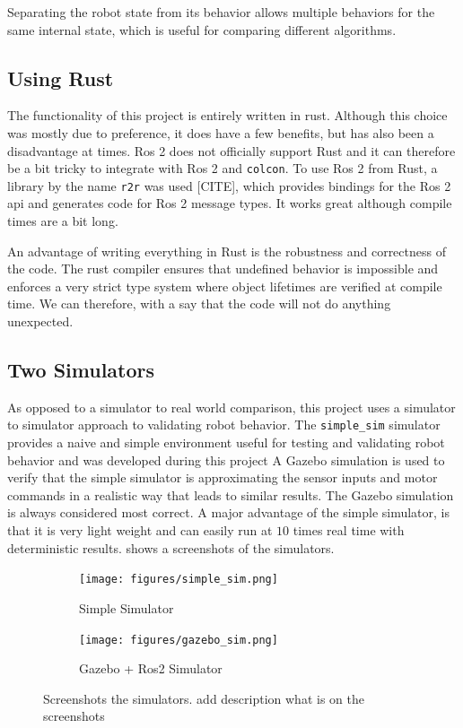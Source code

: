 Separating the robot state from its behavior allows multiple behaviors for the same internal state, which is useful for comparing different algorithms.

\subsection{Using Rust}
The {\color{red} functionality} of this project is entirely written in rust. Although this choice was mostly due to preference, it does have a few benefits, but has also been a {\color{red} disadvantage} at times. Ros 2 {\color{red} does not officially support Rust} and it can therefore be a bit tricky to integrate with Ros 2 and \texttt{colcon}. To use Ros 2 from Rust, a library by the name \texttt{r2r} was used {\color{red}[CITE]}, which provides bindings for the Ros 2 api and generates code for Ros 2 message types. It works great although compile times are a bit long.

An advantage of writing everything in Rust is the robustness and correctness of the code. The rust compiler ensures that undefined behavior is impossible and enforces a very strict type system where object lifetimes are verified at compile time. We can therefore, with a say that the code will not do anything unexpected.

\subsection{Two Simulators}
As opposed to a simulator to real world comparison, this project uses a simulator to simulator approach to validating robot behavior. The \texttt{simple\_sim} simulator provides a naive and simple environment useful for testing and validating robot behavior and was developed during this project A Gazebo simulation is used to verify that the simple simulator is approximating the sensor inputs and motor commands in a realistic way that leads to similar results. The Gazebo simulation is always considered most correct. A major advantage of the simple simulator, is that it is very light weight and can easily run at $10$ times real time with deterministic results.  shows a screenshots of the simulators.

\begin{figure}[h]
    \centering
    \begin{subfigure}[b]{0.45\textwidth}
        \centering
        \texttt{[image: figures/simple\_sim.png]}
        \caption{Simple Simulator}
    \end{subfigure}
    \hfill
    \begin{subfigure}[b]{0.45\textwidth}
        \centering
        \texttt{[image: figures/gazebo\_sim.png]}
        \caption{Gazebo + Ros2 Simulator}
    \end{subfigure}
    \caption{Screenshots the simulators. {\color{red} add description what is on the screenshots}}
    \label{fig:simulators}
\end{figure}
